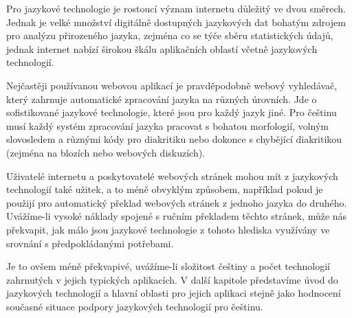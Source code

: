 \begin{multicols}{2}
Pro jazykové technologie je rostoucí význam internetu důležitý ve dvou směrech. Jednak je velké množství digitálně dostupných jazykových dat bohatým zdrojem pro analýzu přirozeného jazyka, zejména co se týče sběru statistických údajů, jednak internet nabízí širokou škálu aplikačních oblastí včetně jazykových technologií.

Nejčastěji používanou webovou aplikací je pravděpodobně webový vyhledávač, který zahrnuje automatické zpracování jazyka na různých úrovních. Jde o sofistikované jazykové technologie, které jsou pro každý jazyk jiné. Pro češtinu musí každý systém zpracování jazyka pracovat s bohatou morfologií, volným slovosledem a různými kódy pro diakritiku nebo dokonce s chybějící diakritikou (zejména na blozích nebo webových diskuzích).

Uživatelé internetu a poskytovatelé webových stránek mohou mít z jazykových technologií také užitek, a to méně obvyklým způsobem, například pokud je použijí pro automatický překlad webových stránek z jednoho jazyka do druhého. Uvážíme-li vysoké náklady spojené s ručním překladem těchto stránek, může nás překvapit, jak málo jsou jazykové technologie z tohoto hlediska využívány ve srovnání s předpokládanými potřebami.

Je to ovšem méně překvapivé, uvážíme-li složitost češtiny a počet technologií zahrnutých v jejich typických aplikacích. V další kapitole představíme úvod do jazykových technologií a hlavní oblasti pro jejich aplikaci stejně jako hodnocení současné situace podpory jazykových technologií pro češtinu.
\end{multicols}
\clearpage

